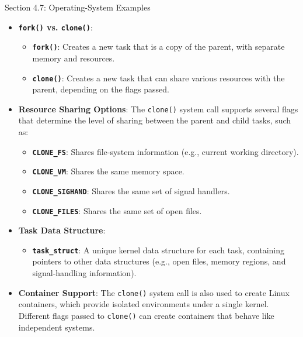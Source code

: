 \begin{notes}{Section 4.7: Operating-System Examples}
    \begin{highlight}
    
        \begin{itemize}
            \item \textbf{\texttt{fork()} vs. \texttt{clone()}}:
                \begin{itemize}
                    \item \textbf{\texttt{fork()}}: Creates a new task that is a copy of the parent, with separate memory and resources.
                    \item \textbf{\texttt{clone()}}: Creates a new task that can share various resources with the parent, depending on the flags passed.
                \end{itemize}
            \item \textbf{Resource Sharing Options}: The \texttt{clone()} system call supports several flags that determine the level of sharing between the parent and child tasks, such as:
                \begin{itemize}
                    \item \textbf{\texttt{CLONE\_FS}}: Shares file-system information (e.g., current working directory).
                    \item \textbf{\texttt{CLONE\_VM}}: Shares the same memory space.
                    \item \textbf{\texttt{CLONE\_SIGHAND}}: Shares the same set of signal handlers.
                    \item \textbf{\texttt{CLONE\_FILES}}: Shares the same set of open files.
                \end{itemize}
            \item \textbf{Task Data Structure}:
                \begin{itemize}
                    \item \textbf{\texttt{task\_struct}}: A unique kernel data structure for each task, containing pointers to other data structures (e.g., open files, memory regions, and signal-handling information).
                \end{itemize}
            \item \textbf{Container Support}: The \texttt{clone()} system call is also used to create Linux containers, which provide isolated environments under a single kernel. Different flags passed to 
            \texttt{clone()} can create containers that behave like independent systems.
        \end{itemize}
    

\end{highlight}
\end{notes}
